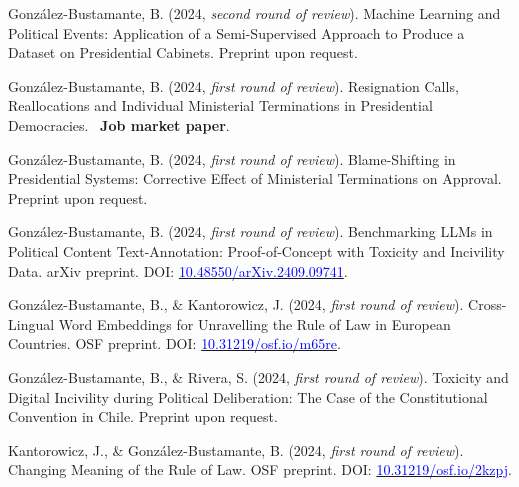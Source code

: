 \begin{publications}

\begin{benumerate}{9}

\item{González-Bustamante, B. (2024, {\itshape second round of review}). Machine Learning and Political Events: Application of a Semi-Supervised Approach to Produce a Dataset on Presidential Cabinets. Preprint upon request.}\vspace{1mm}

\item{González-Bustamante, B. (2024, {\itshape first round of review}). Resignation Calls, Reallocations and Individual Ministerial Terminations in Presidential Democracies. \faBriefcase\ {\bfseries Job market paper}.}\vspace{1mm}

\item{González-Bustamante, B. (2024, {\itshape first round of review}). Blame-Shifting in Presidential Systems: Corrective Effect of Ministerial Terminations on Approval. Preprint upon request.}\vspace{1mm}

\item{González-Bustamante, B. (2024, {\itshape first round of review}). Benchmarking LLMs in Political Content Text-Annotation: Proof-of-Concept with Toxicity and Incivility Data. arXiv preprint. DOI: \href{https://doi.org/10.48550/arXiv.2409.09741}{\textcolor{blue}{10.48550/arXiv.2409.09741}}.}\vspace{1mm}

\item{González-Bustamante, B., \& Kantorowicz, J. (2024, {\itshape first round of review}). Cross-Lingual Word Embeddings for Unravelling the Rule of Law in European Countries. OSF preprint. DOI: \href{https://doi.org/10.31219/osf.io/m65re}{\textcolor{blue}{10.31219/osf.io/m65re}}.}\vspace{1mm}

\item{González-Bustamante, B., \& Rivera, S. (2024, {\itshape first round of review}). Toxicity and Digital Incivility during Political Deliberation: The Case of the Constitutional Convention in Chile. Preprint upon request.}\vspace{1mm}

\item{Kantorowicz, J., \& González-Bustamante, B. (2024, {\itshape first round of review}). Changing Meaning of the Rule of Law. OSF preprint. DOI: \href{https://doi.org/10.31219/osf.io/2kzpj}{\textcolor{blue}{10.31219/osf.io/2kzpj}}.}\vspace{1mm}


\end{benumerate}
\end{publications}
